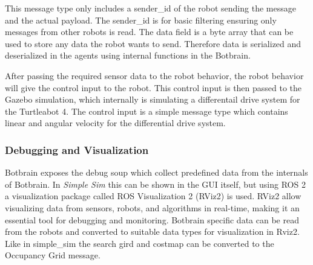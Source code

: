 This message type only includes a sender\_id of the robot sending the message and the actual payload. The sender\_id is for basic filtering ensuring only messages from other robots is read.
The data field is a byte array that can be used to store any data the robot wants to send. Therefore data is serialized and deserialized in the agents using internal functions in the Botbrain.

After passing the required sensor data to the robot behavior, the robot behavior will give the control input to the robot. This control input is then passed to the Gazebo simulation, which internally is simulating a differentail drive system for the Turtleabot 4. The control input is a simple message type which contains linear and angular velocity for the differential drive system.

\subsubsection{Debugging and Visualization}\label{sec:debugging_rviz}
Botbrain exposes the debug soup which collect predefined data from the internals of Botbrain. 
In \textit{Simple Sim} this can be shown in the GUI itself, but using ROS 2 a visualization package called ROS Visualization 2 (RViz2) is used.
RViz2 allow visualizing data from sensors, robots, and algorithms in real-time, making it an essential tool for debugging and monitoring.
Botbrain specific data can be read from the robots and converted to suitable data types for visualization in Rviz2. Like in simple\_sim the search gird and costmap can be converted to the Occupancy Grid message.
